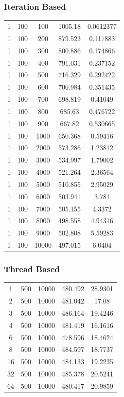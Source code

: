 \documentclass[10pt,letterpaper]{article}
\begin{document}
\subsubsection{Iteration Based}
\begin{tabular}{ c | c | c | c | c }
 1 & 100 & 100 & 1005.18 & 0.0612377 \\
 1 & 100 & 200 & 879.523 & 0.117883 \\
 1 & 100 & 300 & 800.886 & 0.174866 \\
 1 & 100 & 400 & 791.031 & 0.237152 \\
 1 & 100 & 500 & 716.329 & 0.292422 \\
 1 & 100 & 600 & 700.984 & 0.351435 \\
 1 & 100 & 700 & 698.819 & 0.41049 \\
 1 & 100 & 800 & 685.63 & 0.476722 \\
 1 & 100 & 900 & 667.82 & 0.530665 \\
 1 & 100 & 1000 & 650.368 & 0.59416 \\
 1 & 100 & 2000 & 573.286 & 1.23812 \\
 1 & 100 & 3000 & 534.997 & 1.79002 \\
 1 & 100 & 4000 & 521.264 & 2.36564 \\
 1 & 100 & 5000 & 510.855 & 2.95029 \\
 1 & 100 & 6000 & 503.941 & 3.781 \\
 1 & 100 & 7000 & 505.155 & 4.3372 \\
 1 & 100 & 8000 & 498.558 & 4.94316 \\
 1 & 100 & 9000 & 502.808 & 5.59283 \\
 1 & 100 & 10000 & 497.015 & 6.0404 \\
\end{tabular}

\subsubsection{Thread Based}
\begin{tabular}{ c | c | c | c | c }
1 & 500 & 10000 & 480.492 & 28.9301 \\
2 & 500 & 10000 & 481.042 & 17.08 \\
3 & 500 & 10000 & 486.164 & 19.4246 \\
4 & 500 & 10000 & 481.419 & 16.1616 \\
6 & 500 & 10000 & 478.596 & 18.4624 \\
8 & 500 & 10000 & 484.597 & 18.7737 \\
16 & 500 & 10000 & 484.133 & 19.2235 \\
32 & 500 & 10000 & 485.378 & 20.5241 \\
64 & 500 & 10000 & 480.417 & 20.9859 \\
\end{tabular}





{\small


}
\end{document}

